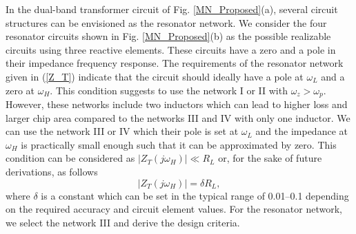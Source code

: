 \documentclass{IEEEtran}
\begin{document}

In the dual-band transformer circuit of Fig. \ref{MN_Proposed}(a), several circuit structures can be envisioned as the resonator network. We consider the four resonator circuits shown in Fig. \ref{MN_Proposed}(b) as the possible realizable circuits using three reactive elements. These circuits have a zero and a pole in their impedance frequency response. The requirements of the resonator network given in (\ref{Z_T}) indicate that the circuit should ideally have a pole at $\omega_L$ and a zero at $\omega_H$. This condition suggests to use the network I or II with $\omega_z > \omega_p$. However, these networks include two inductors which can lead to higher loss and larger chip area compared to the networks III and IV with only one inductor. We can use the network III or IV which their pole is set at $\omega_L$ and the impedance at $\omega_H$ is practically small enough such that it can be approximated by zero. This condition can be considered as $|Z_T(j\omega_H)| \ll R_L$ or, for the sake of future derivations, as follows
\begin{equation}
    \label{ZT_wh}
    |Z_T(j\omega_H)| = {\delta} R_L,
\end{equation}
where $\delta$ is a constant which can be set in the typical range of 0.01--0.1 depending on the required accuracy and circuit element values. For the resonator network, we select the network III and derive the design criteria. 
\end{document}
